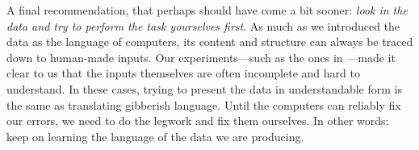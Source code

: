 A final recommendation, that perhaps should have come a bit sooner: \emph{look in the data and try to perform the task yourselves first}. As much as we introduced the data as the language of computers, its content and structure can always be traced down to human-made inputs. Our experiments---such as the ones in ---made it clear to us that the inputs themselves are often incomplete and hard to understand. In these cases, trying to present the data in understandable form is the same as translating gibberish language. Until the computers can reliably fix our errors, we need to do the legwork and fix them ourselves. In other words: keep on learning the language of the data we are producing.